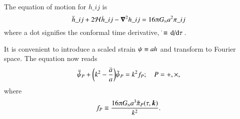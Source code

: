     The equation of motion for $h\_{ij}$ is~\citep{dodelsonModernCosmology2020}
    \begin{equation}\label{eq:GR:gws:eom_h}
        \ddot{h}\_{ij} + 2\mathcal{H}\dot{h}\_{ij} - \vec{\nabla}^2 h\_{ij} = 16\ppi G\nped{N} a^2 \pi\_{ij}
    \end{equation}
    where a dot signifies the conformal time derivative, $\dot{}\equiv \dv*{}{\tau}$. %

    It is convenient to introduce a scaled strain $\psi\equiv a h$ and transform to Fourier space. The equation now reads
    \begin{equation}\label{eq:GR:gws:eom_ah_Ft}
        \ddot{\tilde{\psi}}_P + {\left(  k^2 - \frac{\ddot{a}}{a}  \right)} \tilde{\psi}_P = k^2 f_P; 
        \quad P = +, \times,
    \end{equation}
    where
    \begin{equation}\label{eq:GR:gws:Src_P_def}
        f_P \equiv \frac{16\ppi G\nped{N}a^3 \Ft{\pi}_P(\tau, \vec{k})}{k^2}.
    \end{equation}




